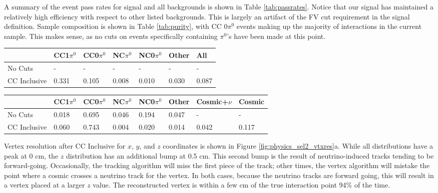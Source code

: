 \par A summary of the event pass rates for signal and all backgrounds is shown in Table \ref{tab:passrates}.  Notice that our signal has maintained a relatively high efficiency with respect to other listed backgrounds. This is largely an artifact of the FV cut requirement in the signal definition. Sample composition is shown in Table \ref{tab:purity}, with CC 0$\pi^0$ events making up the majority of interactions in the current sample. This makes sense, as no cuts on events specifically containing $\pi^0$'s have been made at this point.

\begin{table}[H]
\centering
{}
 \begin{tabular}{| l | l | l |l|l|l|l|}
 \hline
 & CC1$\pi^0$ & CC0$\pi^0$ & NC$\pi^0$ & NC0$\pi^0$ & Other & All \\ [0.1ex] \hline
No Cuts & - & - & - & - & - & -\\
CC Inclusive & 0.331 & 0.105 & 0.008 & 0.010 & 0.030 & 0.087 \\ \hline
\end{tabular}
\end{table}


\begin{table}[H]
\centering
{}
 \begin{tabular}{| l | l | l |l|l|l|l|l|}
 \hline
 & CC1$\pi^0$ & CC0$\pi^0$ & NC$\pi^0$ & NC0$\pi^0$ & Other & Cosmic+$\nu$ & Cosmic \\ [0.1ex] \hline
No Cuts & 0.018 & 0.695 & 0.046 & 0.194 & 0.047 & - & -\\ 
CC Inclusive & 0.060 & 0.743 & 0.004 & 0.020 & 0.014 & 0.042 & 0.117 \\ \hline
\end{tabular}
\end{table}

\par Vertex resolution after CC Inclusive for $x$, $y$, and $z$ coordinates is shown in Figure \ref{fig:physics_sel2_vtxres}a. While all distributions have a peak at 0 cm, the $z$ distribution has an additional bump at 0.5 cm. This second bump is the result of neutrino-induced tracks tending to be forward-going.  Occasionally, the tracking algorithm will miss the first piece of the track; other times, the vertex algorithm will mistake the point where a cosmic crosses a neutrino track for the vertex.  In both cases, because the neutrino tracks are forward going, this will result in a vertex placed at a larger $z$ value. The reconstructed vertex is within a few cm of the true interaction point 94\% of the time. 

